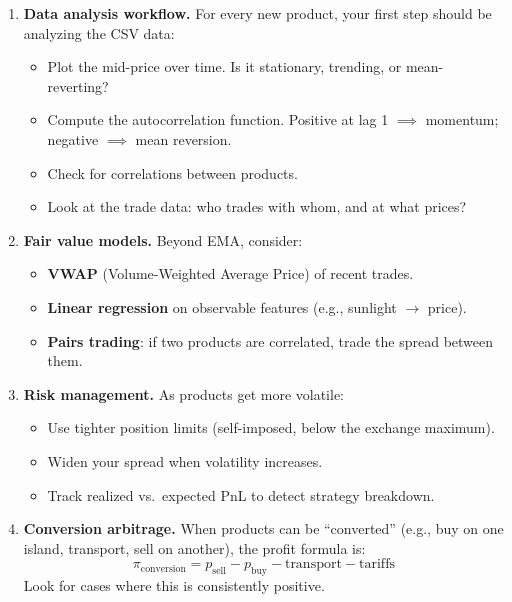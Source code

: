 \documentclass[11pt, letterpaper]{article}
\begin{document}
\begin{enumerate}

    \item \textbf{Data analysis workflow.} For every new product, your first step should be analyzing the CSV data:
    \begin{itemize}
        \item Plot the mid-price over time. Is it stationary, trending, or mean-reverting?
        \item Compute the autocorrelation function. Positive at lag 1 $\implies$ momentum; negative $\implies$ mean reversion.
        \item Check for correlations between products.
        \item Look at the trade data: who trades with whom, and at what prices?
    \end{itemize}

    \item \textbf{Fair value models.} Beyond EMA, consider:
    \begin{itemize}
        \item \textbf{VWAP} (Volume-Weighted Average Price) of recent trades.
        \item \textbf{Linear regression} on observable features (e.g., sunlight $\to$ price).
        \item \textbf{Pairs trading}: if two products are correlated, trade the spread between them.
    \end{itemize}

    \item \textbf{Risk management.} As products get more volatile:
    \begin{itemize}
        \item Use tighter position limits (self-imposed, below the exchange maximum).
        \item Widen your spread when volatility increases.
        \item Track realized vs.\ expected PnL to detect strategy breakdown.
    \end{itemize}

    \item \textbf{Conversion arbitrage.} When products can be ``converted'' (e.g., buy on one island, transport, sell on another), the profit formula is:
    \begin{equation}
        \pi_{\text{conversion}} = p_{\text{sell}} - p_{\text{buy}} - \text{transport} - \text{tariffs}
    \end{equation}
    Look for cases where this is consistently positive.


\end{enumerate}
\end{document}

